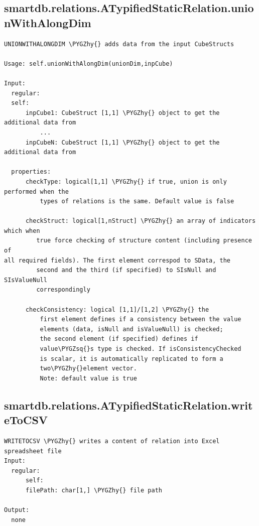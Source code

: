 \documentclass[letterpaper,10pt,english]{sphinxmanual}
\def\PYGZhy{\char`\-}
\def\PYGZsq{\char`\'}
\begin{document}
\subsection{smartdb.relations.ATypifiedStaticRelation.unionWithAlongDim}
\label{chap_functions:smartdb-relations-atypifiedstaticrelation-unionwithalongdim}
\begin{Verbatim}[commandchars=\\\{\}]
UNIONWITHALONGDIM \PYGZhy{} adds data from the input CubeStructs

Usage: self.unionWithAlongDim(unionDim,inpCube)

Input:
  regular:
  self:
      inpCube1: CubeStruct [1,1] \PYGZhy{} object to get the additional data from
          ...
      inpCubeN: CubeStruct [1,1] \PYGZhy{} object to get the additional data from

  properties:
      checkType: logical[1,1] \PYGZhy{} if true, union is only performed when the
          types of relations is the same. Default value is false

      checkStruct: logical[1,nStruct] \PYGZhy{} an array of indicators which when
         true force checking of structure content (including presence of
all required fields). The first element correspod to SData, the
         second and the third (if specified) to SIsNull and SIsValueNull
         correspondingly

      checkConsistency: logical [1,1]/[1,2] \PYGZhy{} the
          first element defines if a consistency between the value
          elements (data, isNull and isValueNull) is checked;
          the second element (if specified) defines if
          value\PYGZsq{}s type is checked. If isConsistencyChecked
          is scalar, it is automatically replicated to form a
          two\PYGZhy{}element vector.
          Note: default value is true
\end{Verbatim}


\subsection{smartdb.relations.ATypifiedStaticRelation.writeToCSV}
\label{chap_functions:smartdb-relations-atypifiedstaticrelation-writetocsv}
\begin{Verbatim}[commandchars=\\\{\}]
WRITETOCSV \PYGZhy{} writes a content of relation into Excel spreadsheet file
Input:
  regular:
      self:
      filePath: char[1,] \PYGZhy{} file path

Output:
  none
\end{Verbatim}
\end{document}
